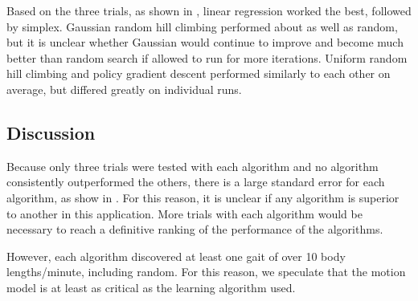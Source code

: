 Based on the three trials, as shown in , linear
regression worked the best, followed by simplex. Gaussian random hill
climbing performed about as well as random, but it is unclear whether
Gaussian would continue to improve and become much better than random
search if allowed to run for more iterations. Uniform random hill
climbing and policy gradient descent performed similarly to each other
on average, but differed greatly on individual runs.




\subsection{Discussion}


Because only three trials were tested with each algorithm and no
algorithm consistently outperformed the others, there is a large
standard error for each algorithm, as show in . For
this reason, it is unclear if any algorithm is superior to another in
this application. More trials with each algorithm would be necessary
to reach a definitive ranking of the performance of the algorithms.

However, each algorithm discovered at least one gait of over 10 body
lengths/minute, including random. For this reason, we speculate that
the motion model is at least as critical as the learning algorithm
used.

